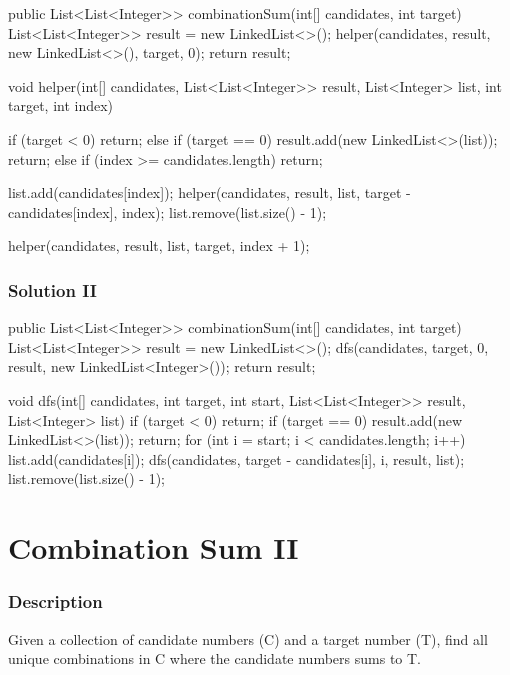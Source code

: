 \begin{Code}
public List<List<Integer>> combinationSum(int[] candidates, int target) {
    List<List<Integer>> result = new LinkedList<>();
    helper(candidates, result, new LinkedList<>(), target, 0);
    return result;
}

void helper(int[] candidates, List<List<Integer>> result, List<Integer> list, int target, int index) {
    if (target < 0) {
        return;
    } else if (target == 0) {
        result.add(new LinkedList<>(list));
        return;
    } else if (index >= candidates.length) {
        return;
    }

    list.add(candidates[index]);
    helper(candidates, result, list, target - candidates[index], index);
    list.remove(list.size() - 1);

    helper(candidates, result, list, target, index + 1);
}
\end{Code}

\newpage

\subsubsection{Solution II}

\begin{Code}

public List<List<Integer>> combinationSum(int[] candidates, int target) {
    List<List<Integer>> result = new LinkedList<>();
    dfs(candidates, target, 0, result, new LinkedList<Integer>());
    return result;
}

void dfs(int[] candidates, int target, int start, List<List<Integer>> result, List<Integer> list) {
    if (target < 0) {
        return;
    }
    if (target == 0) {
        result.add(new LinkedList<>(list));
        return;
    }
    for (int i = start; i < candidates.length; i++) {
        list.add(candidates[i]);
        dfs(candidates, target - candidates[i], i, result, list);
        list.remove(list.size() - 1);
    }
}
\end{Code}

\newpage

\section{Combination Sum II} %

\subsubsection{Description}
Given a collection of candidate numbers (C) and a target number (T), find all unique combinations in C where the candidate numbers sums to T.

